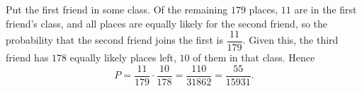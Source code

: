 Put the first friend in some class. Of the remaining $179$ places, $11$ are in the first friend's class, and all places are equally likely for the second friend, so the probability that the second friend joins the first is $\dfrac{11}{179}$. Given this, the third friend has $178$ equally likely places left, $10$ of them in that class. Hence
\[P=\dfrac{11}{179}\cdot\dfrac{10}{178}=\dfrac{110}{31862}=\boxed{\dfrac{55}{15931}}.\]
